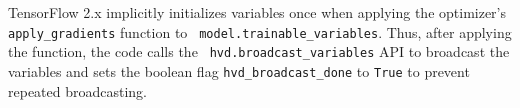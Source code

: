 TensorFlow 2.x implicitly initializes variables once when applying the
optimizer's {\tt apply\_gradients} function to {\tt
model.trainable\_variables}.
Thus, after applying the function, the code calls the {\tt
hvd.broadcast\_variables} API to broadcast the variables and sets the boolean
flag {\tt hvd\_broadcast\_done} to {\tt True} to prevent repeated broadcasting.
